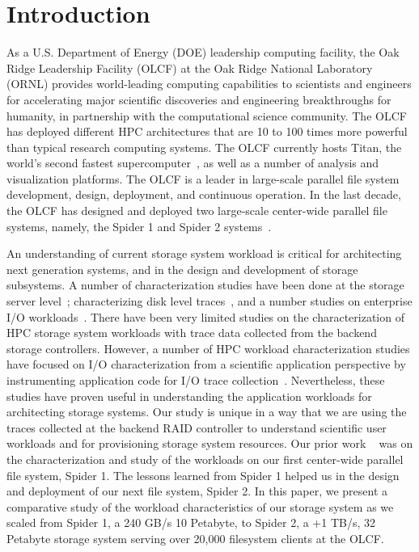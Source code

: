 \section{Introduction}
\label{sec:intro}

As a U.S. Department of Energy (DOE) leadership computing facility, the Oak
Ridge Leadership Facility (OLCF) at the Oak Ridge National Laboratory (ORNL)
provides world-leading computing capabilities to scientists and engineers for
accelerating major scientific discoveries and engineering breakthroughs for
humanity, in partnership with the computational science community. The OLCF has
deployed different HPC architectures that are 10 to 100 times more powerful
than typical research computing systems. The OLCF currently hosts Titan, the
world's second fastest supercomputer~\cite{titan}, as well as a
number of analysis and visualization platforms. The OLCF is a leader in large-scale
parallel file system development, design, deployment, and continuous operation. In the
last decade, the OLCF has designed and deployed two large-scale center-wide
parallel file systems, namely, the Spider 1 and Spider 2 systems~\cite{spider1,
spider2}.

An understanding of current storage system workload is critical for
architecting next generation systems, and in the design and development of
storage subsystems. A number of characterization studies have been done at the
storage server level~\cite{hpca04:zhang, iiswc08:swaroop}; characterizing disk level
traces~\cite{ sigmetrics09:alma}, and a number studies on enterprise I/O
workloads~\cite{gmach2007workload, hpca04:zhang}. There have been very limited
studies on the characterization of HPC storage system workloads with trace
data collected from the backend storage controllers. However, a number of HPC
workload characterization studies have focused on I/O characterization from a
scientific application perspective by instrumenting application code for I/O
trace collection~\cite{Carns:2011, shan2008characterizing}. Nevertheless,
these studies have proven useful in understanding the application workloads
for architecting storage systems. Our study is unique in a way that we are
using the traces collected at the backend RAID controller to understand
scientific user workloads and for provisioning storage system resources. Our
prior work ~\cite{ spider1-workload} was on the characterization and study of
the workloads on our first center-wide parallel file system, Spider 1. The
lessons learned from Spider 1 helped us in the design and deployment of our
next file system, Spider 2. In this paper, we present a comparative study of
the workload characteristics of our storage system as we scaled from Spider 1,
a 240 GB/s 10 Petabyte, to Spider 2, a +1 TB/s, 32 Petabyte storage system
serving over 20,000 filesystem clients at the OLCF.

